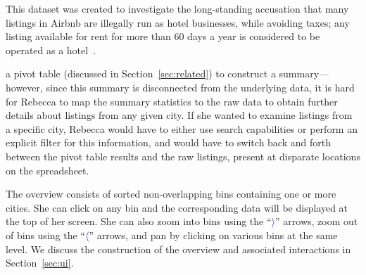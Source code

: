 This dataset was created to investigate the long-standing
accusation that many listings in Airbnb are illegally
run as hotel businesses, while avoiding taxes;
any listing available for rent for more than $60$ days
a year is considered to be operated as a hotel~\cite{accusation}. 

a pivot table (discussed in Section~\ref{sec:related})
to construct
a summary---however, since this summary is disconnected
from the underlying data, it is hard for Rebecca to
map the summary statistics to
the raw data to obtain further details
about listings from any given city.
If she wanted to examine listings from a 
specific city,
Rebecca would have to either use search capabilities or
perform an explicit filter for this information,
and would have to switch back and forth between the
pivot table results and the raw listings,
present at disparate locations
on the spreadsheet.



The overview consists of sorted non-overlapping bins
containing one or more cities.
She can click on any bin and the corresponding
data will be displayed at the top of her screen.
She can also zoom into bins using the ``\textcolor{blue}{$\rangle$}'' arrows,
zoom out of bins using the ``\textcolor{blue}{$\langle$}'' arrows,
and pan by clicking on various bins at the same level.
We discuss the construction of the overview
and associated interactions in Section~\ref{sec:ui}.


